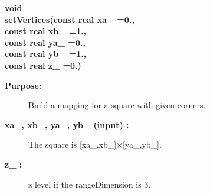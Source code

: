 \begin{flushleft} \textbf{%
void  \\ 
\settowidth{\SquareMappingIncludeArgIndent}{setVertices(}%
setVertices(const real xa\_  =0., \\ 
\hspace{\SquareMappingIncludeArgIndent}const real xb\_  =1., \\ 
\hspace{\SquareMappingIncludeArgIndent}const real ya\_  =0.,\\ 
\hspace{\SquareMappingIncludeArgIndent}const real yb\_  =1.,\\ 
\hspace{\SquareMappingIncludeArgIndent}const real z\_   =0.)
}\end{flushleft}
\begin{description}
\item[{\bf Purpose:}]  Build a mapping for a square with given corners.
\item[{\bf xa\_, xb\_, ya\_, yb\_ (input) :}]  The square is [xa\_,xb\_]$\times$[ya\_,yb\_].
\item[{\bf z\_ :}]  z level if the rangeDimension is 3.
\end{description}
